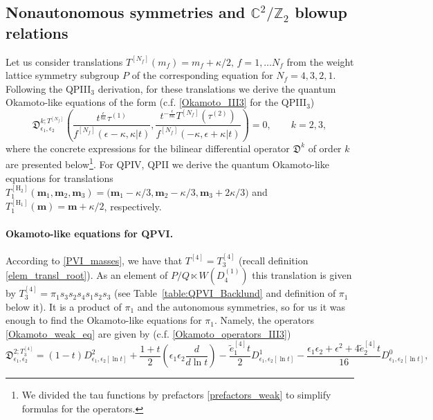 \documentclass[12pt,a4paper]{article}
\numberwithin{equation}{section}
\begin{document}
\subsection{Nonautonomous symmetries and $\mathbb{C}^2/\mathbb{Z}_2$ blowup relations}
\label{ssec:Okamoto-like}

Let us consider translations $T^{[N_f]}(m_f)= m_f+\kappa/2,\, f=1,\ldots N_f$ from the weight lattice symmetry subgroup $P$ of the corresponding equation for $N_f=4,3,2,1$. Following the QPIII$_3$ derivation, for these translations we derive the quantum Okamoto-like equations of the form (c.f. \eqref{Okamoto_III3} for the QPIII$_3$)
\begin{equation}\label{Okamoto_weak_eq}
\mathfrak{D}^{k;T^{[N_f]}}_{\epsilon_1,\epsilon_2}\left(\frac{t^{\frac{\epsilon}{8\kappa}}\tau^{(1)}}{f^{[N_f]}(\epsilon{-}\kappa,\kappa|t)},\frac{t^{-\frac{\epsilon}{8\kappa}}T^{[N_f]}(\tau^{(2)})}{f^{[N_f]}(-\kappa,\epsilon{+}\kappa|t)}\right)=0, \qquad k=2,3, 
\end{equation}
where the concrete expressions for the bilinear differential operator $\mathfrak{D}^{k}$ of order $k$ are presented below\footnote{We divided the tau functions by prefactors \eqref{prefactors_weak} to simplify formulas for the operators.}. For QPIV, QPII we derive the quantum Okamoto-like equations for translations $T_1^{[\mathrm{H_2}]}(\boldsymbol{m}_1,\boldsymbol{m}_2,\boldsymbol{m}_3)=\big(\boldsymbol{m}_1-\kappa/3,\boldsymbol{m}_2-\kappa/3,\boldsymbol{m}_3+2\kappa/3\big)$ and $T_1^{[\mathrm{H_1}]}(\boldsymbol{m})=\boldsymbol{m}+\kappa/2$, respectively.

\paragraph{Okamoto-like equations for QPVI.}
According to \eqref{PVI_masses}, we have that $T^{[4]}=T^{[4]}_3$ (recall definition \eqref{elem_transl_root}). As an element of $P/Q\ltimes W\left(D_4^{(1)}\right)$ this translation is given by $T_3^{[4]}=\pi_1s_3s_2s_4s_1s_2s_3$
(see Table~\ref{table:QPVI_Backlund} and definition of $\pi_1$ below it). It is a product of $\pi_1$ and the autonomous symmetries, so for us it was enough to find the Okamoto-like equations for $\pi_1$. Namely, the operators \eqref{Okamoto_weak_eq} are given by (c.f. \eqref{Okamoto_operators_III3})
\begin{equation}\label{Okamoto_op_VI_2}
\mathfrak{D}^{2;T_3^{[4]}}_{\epsilon_1,\epsilon_2}=(1{-}t)D^2_{\epsilon_1,\epsilon_2[\ln t]}+\frac{1{+}t}2\left(\epsilon_1\epsilon_2\frac{d}{d\ln t}\right)-\frac{\tilde{e}_1^{[4]}t}2 D^1_{\epsilon_1,\epsilon_2[\ln t]}-\frac{\epsilon_1\epsilon_2{+}\epsilon^2+4\tilde{e}_2^{[4]}t}{16}D^0_{\epsilon_1,\epsilon_2[\ln t]},
\end{equation}
\end{document}
